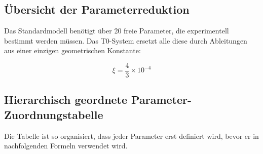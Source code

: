 \subsection{Übersicht der Parameterreduktion}
\label{subsec:parameter_overview}

Das Standardmodell benötigt über 20 freie Parameter, die experimentell bestimmt werden müssen. Das T0-System ersetzt alle diese durch Ableitungen aus einer einzigen geometrischen Konstante:

\begin{equation}
	\boxed{\xi = \frac{4}{3} \times 10^{-4}}
\end{equation}

\subsection{Hierarchisch geordnete Parameter-Zuordnungstabelle}
\label{subsec:hierarchical_mapping}

Die Tabelle ist so organisiert, dass jeder Parameter erst definiert wird, bevor er in nachfolgenden Formeln verwendet wird.

